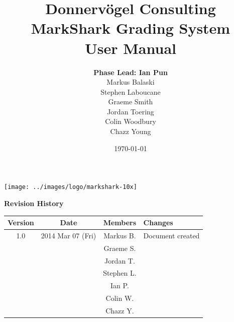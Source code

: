 \documentclass{article}
\begin{document}
\title{Donnervögel Consulting \\ MarkShark Grading System \\ User Manual}
\author{\textbf{Phase Lead: Ian Pun} \\ Markus Balaski \\ Stephen Laboucane \\
  Graeme Smith \\ Jordan Toering \\  Colin Woodbury \\ Chazz Young}
\date{\today}
\maketitle
\centerline{\texttt{[image: ../images/logo/markshark-10x]}}
\clearpage

\textbf{Revision History}
\begin{center}
  \begin{tabular}{| c | c | c | l |}
    \hline
    Version & Date & Members & Changes\\
    \hline
    1.0 & 2014 Mar 07 (Fri) & Markus B. & Document created\\
    & & Graeme S. & \\
    & & Jordan T. & \\
    & & Stephen L. & \\
    & & Ian P. & \\
    & & Colin W. & \\
    & & Chazz Y. & \\
    \hline
  \end{tabular}
\end{center}
\clearpage

\tableofcontents
\clearpage

\end{document}
